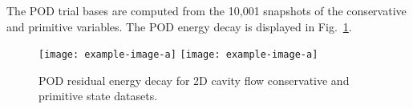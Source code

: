 The POD trial bases are computed from the 10,001 snapshots of the conservative and primitive variables. The POD energy decay is displayed in Fig.~\ref{fig:cavityPODEnergy}.

\begin{figure}
	\centering
	\ifdefined\DRAFT
		\texttt{[image: example-image-a]}
	\else
		\texttt{[image: example-image-a]}
	\fi
	\caption{\label{fig:cavityPODEnergy}POD residual energy decay for 2D cavity flow conservative and primitive state datasets.}
\end{figure}